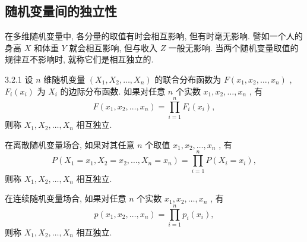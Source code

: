    \subsection{随机变量间的独立性}\label{ssec:3.2.4}
   在多维随机变量中, 各分量的取值有时会相互影响, 但有时毫无影响. 譬如一个人的身高 $X$ 和体重 $Y$ 就会相互影响, 但与收入 $Z$ 一般无影响. 当两个随机变量取值的规律互不影响时, 就称它们是相互独立的.
   \begin{definition}{}{3.2.1}
   	设 $n$ 维随机变量 $(X_1,X_2,\ldots,X_n)$ 的联合分布函数为 $F(x_1,x_2,\ldots,x_n)$ , $F_i(x_i)$ 为 $X_i$ 的边际分布函数. 如果对任意 $n$ 个实数 $x_1,x_2,\ldots,x_n$ , 有
   	\begin{equation}\label{eq:3.2.7}
   		F(x_1,x_2,\ldots,x_n)=\prod_{i=1}^{n}F_i(x_i),
   	\end{equation}
   	则称 $X_1,X_2,\ldots,X_n$ 相互独立.
   \end{definition}
   在离散随机变量场合, 如果对其任意 $n$ 个取值 $x_1,x_2,\ldots,x_n$ , 有
   \begin{equation}\label{eq:3.2.8}
   	P(X_1=x_1,X_2=x_2,\ldots,X_n=x_n)=\prod_{i=1}^{n}P(X_i=x_i),
   \end{equation}
   则称 $X_1,X_2,\ldots,X_n$ 相互独立.
   
   在连续随机变量场合, 如果对任意 $n$ 个实数 $x_1,x_2,\ldots,x_n$ , 有
   \begin{equation}\label{eq:3.2.9}
   	p(x_1,x_2,\ldots,x_n)=\prod_{i=1}^{n}p_i(x_i),
   \end{equation}
   则称 $X_1,X_2,\ldots,X_n$ 相互独立.
   
